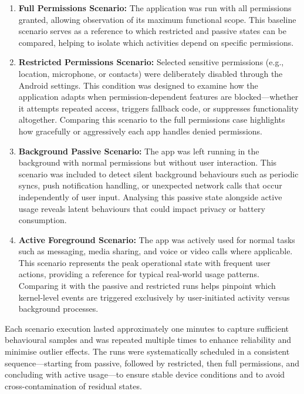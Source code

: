\documentclass[a4paper,12pt]{report}
\begin{document}
\begin{enumerate}[label=\roman*.]
  \item \textbf{Full Permissions Scenario:} The application was run with all permissions granted, allowing observation of its maximum functional scope. This baseline scenario serves as a reference to which restricted and passive states can be compared, helping to isolate which activities depend on specific permissions.

  \item \textbf{Restricted Permissions Scenario:} Selected sensitive permissions (e.g., location, microphone, or contacts) were deliberately disabled through the Android settings. This condition was designed to examine how the application adapts when permission-dependent features are blocked—whether it attempts repeated access, triggers fallback code, or suppresses functionality altogether. Comparing this scenario to the full permissions case highlights how gracefully or aggressively each app handles denied permissions.

  \item \textbf{Background Passive Scenario:} The app was left running in the background with normal permissions but without user interaction. This scenario was included to detect silent background behaviours such as periodic syncs, push notification handling, or unexpected network calls that occur independently of user input. Analysing this passive state alongside active usage reveals latent behaviours that could impact privacy or battery consumption.

  \item \textbf{Active Foreground Scenario:} The app was actively used for normal tasks such as messaging, media sharing, and voice or video calls where applicable. This scenario represents the peak operational state with frequent user actions, providing a reference for typical real-world usage patterns. Comparing it with the passive and restricted runs helps pinpoint which kernel-level events are triggered exclusively by user-initiated activity versus background processes.
\end{enumerate}

Each scenario execution lasted approximately one minutes to capture sufficient behavioural samples and was repeated multiple times to enhance reliability and minimise outlier effects. The runs were systematically scheduled in a consistent sequence—starting from passive, followed by restricted, then full permissions, and concluding with active usage—to ensure stable device conditions and to avoid cross-contamination of residual states.
\end{document}
